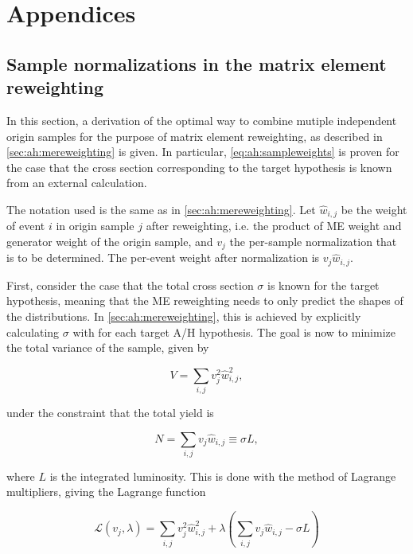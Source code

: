 \chapter{Appendices}

\section{Sample normalizations in the matrix element reweighting}
\label{app:mereweighting}
In this section, a derivation of the optimal way to combine mutiple independent origin samples for the purpose of matrix element reweighting, as described in \cref{sec:ah:mereweighting} is given. In particular, \cref{eq:ah:sampleweights} is proven for the case that the cross section corresponding to the target hypothesis is known from an external calculation.

The notation used is the same as in \cref{sec:ah:mereweighting}. Let $\hat{w}_{i,j}$ be the weight of event $i$ in origin sample $j$ after reweighting, i.e. the product of ME weight and generator weight of the origin sample, and $v_j$ the per-sample normalization that is to be determined. The per-event weight after normalization is $v_j \hat{w}_{i,j}$. 

First, consider the case that the total cross section $\sigma$ is known for the target hypothesis, meaning that the ME reweighting needs to only predict the shapes of the distributions. In \cref{sec:ah:mereweighting}, this is achieved by explicitly calculating $\sigma$ with \madgraph for each target A/H hypothesis. The goal is now to minimize the total variance of the sample, given by

\begin{equation}
    V = \sum_{i,j} v_j^2 \hat{w}_{i,j}^2 ,
\end{equation}

\noindent under the constraint that the total yield is

\begin{equation}
\label{eq:app:mecontstraint}
    N = \sum_{i,j} v_j \hat{w}_{i,j} \equiv \sigma L ,
\end{equation}

\noindent where $L$ is the integrated luminosity. This is done with the method of Lagrange multipliers, giving the Lagrange function

\begin{equation}
    \mathcal{L} (v_j, \lambda) = \sum_{i,j} v_j^2 \hat{w}_{i,j}^2 + \lambda \left( \sum_{i,j} v_j \hat{w}_{i,j} - \sigma L \right)
\end{equation}

